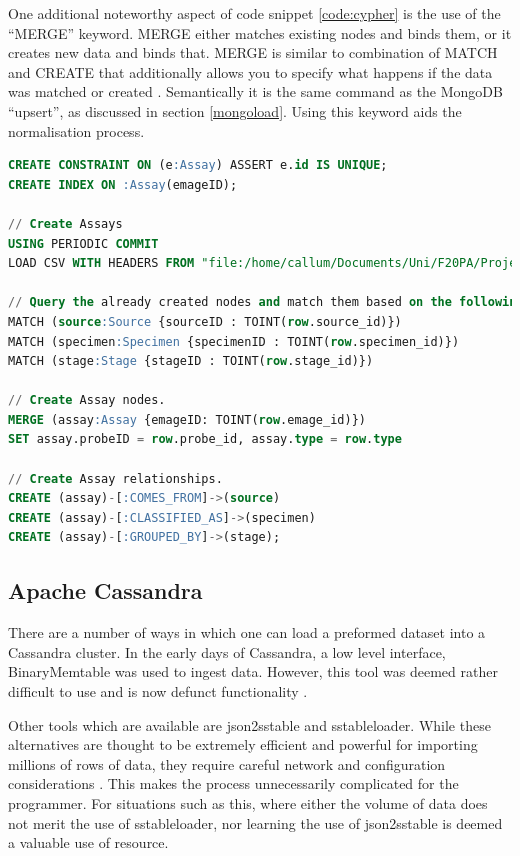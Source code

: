 One additional noteworthy aspect of code snippet \ref{code:cypher} is the use of the ``MERGE'' keyword. MERGE either matches existing nodes and binds them, or it creates new data and binds that. MERGE is similar to combination of MATCH and CREATE that additionally allows you to specify what happens if the data was matched or created \cite{nd}. Semantically it is the same command as the MongoDB ``upsert'', as discussed in section \ref{mongoload}. Using this keyword aids the normalisation process.
\newpage
\vspace*{\fill}
\begin{lstlisting}[language=SQL, caption=Cypher file created to load assay data into the Neo4j data model., label=code:cypher]
CREATE CONSTRAINT ON (e:Assay) ASSERT e.id IS UNIQUE;
CREATE INDEX ON :Assay(emageID);

// Create Assays
USING PERIODIC COMMIT
LOAD CSV WITH HEADERS FROM "file:/home/callum/Documents/Uni/F20PA/Project/Neo4j/Data/Assays.csv" AS row

// Query the already created nodes and match them based on the following clauses.
MATCH (source:Source {sourceID : TOINT(row.source_id)})
MATCH (specimen:Specimen {specimenID : TOINT(row.specimen_id)})
MATCH (stage:Stage {stageID : TOINT(row.stage_id)})

// Create Assay nodes.
MERGE (assay:Assay {emageID: TOINT(row.emage_id)})
SET assay.probeID = row.probe_id, assay.type = row.type

// Create Assay relationships.
CREATE (assay)-[:COMES_FROM]->(source)
CREATE (assay)-[:CLASSIFIED_AS]->(specimen)
CREATE (assay)-[:GROUPED_BY]->(stage);
\end{lstlisting}
\vspace*{\fill}
\newpage

\subsection{Apache Cassandra}
There are a number of ways in which one can load a preformed dataset into a Cassandra cluster. In the early days of Cassandra, a low level interface, BinaryMemtable was used to ingest data. However, this tool was deemed rather difficult to use and is now defunct functionality \cite{cass}.

Other tools which are available are json2sstable and sstableloader. While these alternatives are thought to be extremely efficient and powerful for importing millions of rows of data, they require careful network and configuration considerations \cite{cass}. This makes the process unnecessarily complicated for the programmer. For situations such as this, where either the volume of data does not merit the use of sstableloader, nor learning the use of json2sstable is deemed a valuable use of resource.

